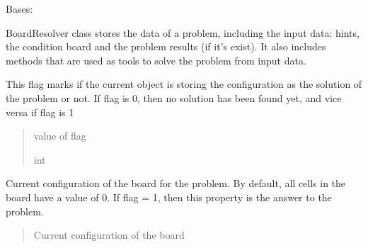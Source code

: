 \documentclass[letterpaper,10pt,english]{sphinxmanual}
\begin{document}
\begin{fulllineitems}
\label{\detokenize{board_resolver:board_resolver.BoardResolver}}
\pysigstartsignatures
{}
\pysigstopsignatures
\sphinxAtStartPar
Bases: 

\sphinxAtStartPar
BoardResolver class stores the data of a problem, including the
input data: hints, the condition board and the problem results
(if it’s exist). It also includes methods that are used as tools
to solve the problem from input data.

\begin{fulllineitems}
\label{\detokenize{board_resolver:board_resolver.BoardResolver.flag}}
\pysigstartsignatures
{}
\pysigstopsignatures
\sphinxAtStartPar
This flag marks if the current object is storing the
configuration as the solution of the problem or not.
If flag is 0, then no solution has been found yet, and vice
versa if flag is 1
\begin{quote}\begin{description}
\sphinxAtStartPar
value of flag

\sphinxAtStartPar
int

\end{description}\end{quote}

\end{fulllineitems}


\begin{fulllineitems}
\label{\detokenize{board_resolver:board_resolver.BoardResolver.curBrd}}
\pysigstartsignatures
{}
\pysigstopsignatures
\sphinxAtStartPar
Current configuration of the board for the problem.
By default, all cells in the board have a value of 0. If flag = 1,
then this property is the answer to the problem.
\begin{quote}\begin{description}
\sphinxAtStartPar
Current configuration of the board


\end{description}
\end{quote}
\end{fulllineitems}
\end{fulllineitems}
\end{document}
